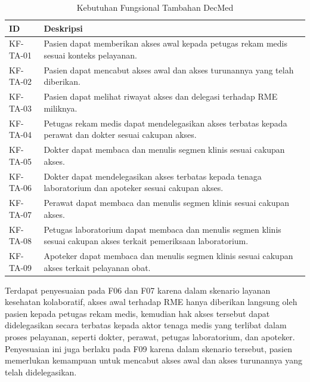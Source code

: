 \begin{table}[!ht]
	\centering
	\caption{Kebutuhan Fungsional Tambahan DecMed}
	\label{tab:kebutuhan-fungsional-tambahan-decmed}
	\begin{tabular}{|p{2cm}|p{10.5cm}|}
		\hline
		\textbf{ID} & \textbf{Deskripsi}                                                                                                  \\
		\hline
		KF-TA-01    & Pasien dapat memberikan akses awal kepada petugas rekam medis sesuai konteks pelayanan.                             \\ \hline
		KF-TA-02    & Pasien dapat mencabut akses awal dan akses turunannya yang telah diberikan.                                         \\ \hline
		KF-TA-03    & Pasien dapat melihat riwayat akses dan delegasi terhadap RME miliknya.                                              \\ \hline
		KF-TA-04    & Petugas rekam medis dapat mendelegasikan akses terbatas kepada perawat dan dokter sesuai cakupan akses.             \\ \hline
		KF-TA-05    & Dokter dapat membaca dan menulis segmen klinis sesuai cakupan akses.                                                \\ \hline
		KF-TA-06    & Dokter dapat mendelegasikan akses terbatas kepada tenaga laboratorium dan apoteker sesuai cakupan akses.            \\ \hline
		KF-TA-07    & Perawat dapat membaca dan menulis segmen klinis sesuai cakupan akses.                                               \\ \hline
		KF-TA-08    & Petugas laboratorium dapat membaca dan menulis segmen klinis sesuai cakupan akses terkait pemeriksaan laboratorium. \\ \hline
		KF-TA-09    & Apoteker dapat membaca dan menulis segmen klinis sesuai cakupan akses terkait pelayanan obat.                       \\ \hline
	\end{tabular}
\end{table}

Terdapat penyesuaian pada F06 dan F07 karena dalam skenario layanan kesehatan kolaboratif, akses awal terhadap RME hanya diberikan langsung oleh pasien kepada petugas rekam medis, kemudian hak akses tersebut dapat didelegasikan secara terbatas kepada aktor tenaga medis yang terlibat dalam proses pelayanan, seperti dokter, perawat, petugas laboratorium, dan apoteker. Penyesuaian ini juga berlaku pada F09 karena dalam skenario tersebut, pasien memerlukan kemampuan untuk mencabut akses awal dan akses turunannya yang telah didelegasikan.


